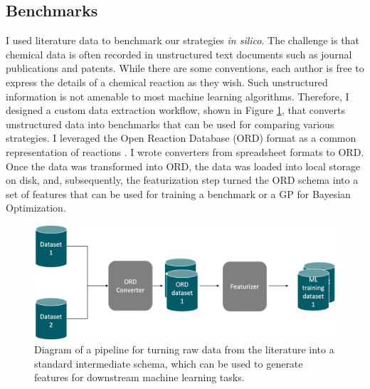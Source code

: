 \subsection{Benchmarks}

I used literature data to benchmark our strategies \textit{in silico}. The challenge is that chemical data is often recorded in unstructured text documents such as journal publications and patents. While there are some conventions, each author is free to express the details of a chemical reaction as they wish. Such unstructured information is not amenable to most machine learning algorithms. Therefore, I designed a custom data extraction workflow, shown in Figure \ref{fig:ord_pipeline}, that converts unstructured data into benchmarks that can be used for comparing various strategies. I leveraged the Open Reaction Database (ORD) format as a common representation of reactions \cite{Kearnes2021}. I wrote converters from spreadsheet formats to ORD. Once the data was transformed into ORD, the data was loaded into local storage on disk, and, subsequently, the featurization step turned the ORD schema into a set of features that can be used for training a benchmark or a GP for Bayesian Optimization.

\begin{figure}[t]
    \centering
    \includegraphics[width=\textwidth]{gfx/Chapter04/etl_pipeline.png}
    \caption{Diagram of a pipeline for turning raw data from the literature into a standard intermediate schema, which can be used to generate features for downstream machine learning tasks.}
    \label{fig:ord_pipeline}
\end{figure}

